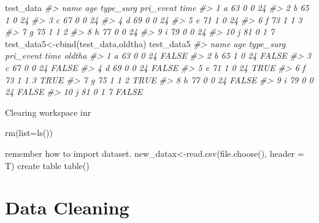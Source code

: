\documentclass[
]{article}
\newenvironment{Shaded}{\begin{snugshade}}{\end{snugshade}}
\newcommand{\AttributeTok}[1]{\textcolor[rgb]{0.77,0.63,0.00}{#1}}
\newcommand{\CommentTok}[1]{\textcolor[rgb]{0.56,0.35,0.01}{\textit{#1}}}
\newcommand{\FunctionTok}[1]{\textcolor[rgb]{0.00,0.00,0.00}{#1}}
\newcommand{\NormalTok}[1]{#1}
\newcommand{\OtherTok}[1]{\textcolor[rgb]{0.56,0.35,0.01}{#1}}
\begin{document}
\begin{Shaded}
\begin{Highlighting}[]
\NormalTok{test\_data}
\CommentTok{\#\textgreater{}    name age type\_surg pri\_event time}
\CommentTok{\#\textgreater{} 1     a  63         0         0   24}
\CommentTok{\#\textgreater{} 2     b  65         1         0   24}
\CommentTok{\#\textgreater{} 3     c  67         0         0   24}
\CommentTok{\#\textgreater{} 4     d  69         0         0   24}
\CommentTok{\#\textgreater{} 5     e  71         1         0   24}
\CommentTok{\#\textgreater{} 6     f  73         1         1    3}
\CommentTok{\#\textgreater{} 7     g  75         1         1    2}
\CommentTok{\#\textgreater{} 8     h  77         0         0   24}
\CommentTok{\#\textgreater{} 9     i  79         0         0   24}
\CommentTok{\#\textgreater{} 10    j  81         0         1    7}
\NormalTok{test\_data5}\OtherTok{\textless{}{-}}\FunctionTok{cbind}\NormalTok{(test\_data,oldtha)}
\NormalTok{test\_data5}
\CommentTok{\#\textgreater{}    name age type\_surg pri\_event time oldtha}
\CommentTok{\#\textgreater{} 1     a  63         0         0   24  FALSE}
\CommentTok{\#\textgreater{} 2     b  65         1         0   24  FALSE}
\CommentTok{\#\textgreater{} 3     c  67         0         0   24  FALSE}
\CommentTok{\#\textgreater{} 4     d  69         0         0   24  FALSE}
\CommentTok{\#\textgreater{} 5     e  71         1         0   24   TRUE}
\CommentTok{\#\textgreater{} 6     f  73         1         1    3   TRUE}
\CommentTok{\#\textgreater{} 7     g  75         1         1    2   TRUE}
\CommentTok{\#\textgreater{} 8     h  77         0         0   24  FALSE}
\CommentTok{\#\textgreater{} 9     i  79         0         0   24  FALSE}
\CommentTok{\#\textgreater{} 10    j  81         0         1    7  FALSE}
\end{Highlighting}
\end{Shaded}

Clearing workspace inr

\begin{Shaded}
\begin{Highlighting}[]
\FunctionTok{rm}\NormalTok{(}\AttributeTok{list=}\FunctionTok{ls}\NormalTok{())}
\end{Highlighting}
\end{Shaded}

remember how to import dataset.
new\_datax\textless-read.csv(file.choose(), header = T)
create table
table()

\hypertarget{data-cleaning}{%
\section{Data Cleaning}\label{data-cleaning}}
\end{document}
